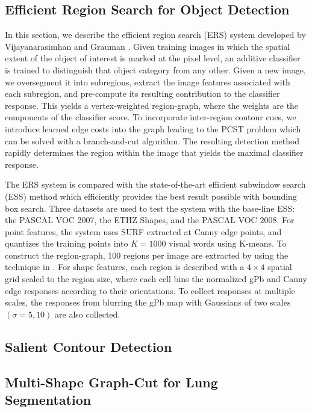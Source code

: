 \documentclass{SMBV12}
\begin{document}
\subsection{Efficient Region Search for Object Detection}

In this section, we describe the efficient region search (ERS) system developed by Vijayanarasimhan and Grauman \cite{VijayGrauman2011}. Given training images in which the spatial extent of the object of interest is marked at the pixel level, an additive classifier is trained to distinguish that object category from any other. Given a new image, we oversegment it into subregions, extract the image features associated with each subregion, and pre-compute its resulting contribution to the classifier response. This yields a vertex-weighted region-graph, where the weights are the components of the classifier score. To incorporate inter-region contour cues, we introduce learned edge costs into the graph leading to the PCST problem which can be solved with a branch-and-cut algorithm. The resulting detection method rapidly determines the region within the image that yields the maximal classifier response.

The ERS system is compared with the state-of-the-art efficient subwindow search (ESS) method \cite{lampert2008beyond} which efficiently provides the best result possible with bounding box search. Three datasets are used to test the system with the base-line ESS: the PASCAL VOC 2007, the ETHZ Shapes, and the PASCAL VOC 2008. For point features, the system uses SURF extracted at Canny edge points, and quantizes the training points into $K = 1000$ visual words using K-means. To construct the region-graph, 100 regions per image are extracted by using the technique in \cite{arbelaez2009contours}. For shape features, each region is described with a $4 \times 4$ spatial grid scaled to the region size, where each cell bins the normalized gPb and Canny edge responses according to their orientations. To collect responses at multiple scales, the responses from blurring the gPb map with Gaussians of two scales $(\sigma = 5, 10)$ are also collected.

\subsection{Salient Contour Detection}

\cite{KenGalShi2011}

\subsection{Multi-Shape Graph-Cut for Lung Segmentation}
\end{document}
